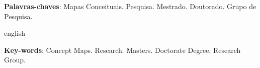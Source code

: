 
\setlength{\absparsep}{18pt} %
\begin{resumo}
	
    \lipsum[7]
    
	\vspace{\onelineskip}
 
	\noindent 
	\textbf{Palavras-chaves}: Mapas Conceituais. Pesquisa. Mestrado. Doutorado. Grupo de Pesquisa. 
\end{resumo}

\begin{resumo}[Abstract]
\begin{otherlanguage*}{english}
	\lipsum[8]
    
	\vspace{\onelineskip}
 
	\noindent 
	\textbf{Key-words}: Concept Maps. Research. Masters. Doctorate Degree. Research Group.
\end{otherlanguage*}
\end{resumo}



\listoffigures*
\cleardoublepage



\listoftables*
\cleardoublepage


